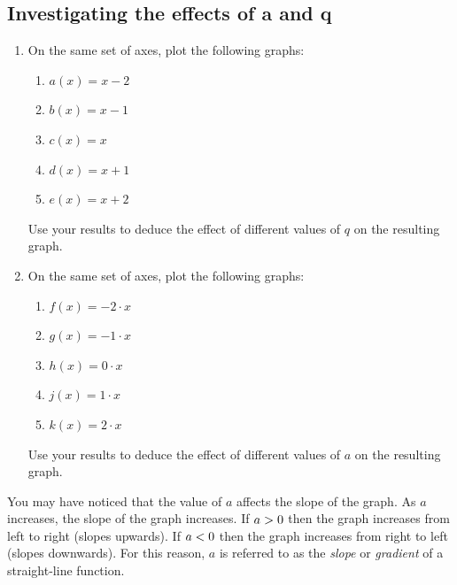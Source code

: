             \subsection{  Investigating the effects of a and q}
            \nopagebreak
        \label{m39338*id237639}\begin{enumerate}[noitemsep, label=\textbf{\arabic*}. ] 
            \label{m39338*uid70}\item On the same set of axes, plot the following graphs:
\label{m39338*id237654}\begin{enumerate}[noitemsep, label=\textbf{\alph*}. ] 
            \label{m39338*uid71}\item $a\left(x\right)=x-2$\label{m39338*uid72}\item $b\left(x\right)=x-1$\label{m39338*uid73}\item $c\left(x\right)=x$\label{m39338*uid74}\item $d\left(x\right)=x+1$\label{m39338*uid75}\item $e\left(x\right)=x+2$\end{enumerate}
Use your results to deduce the effect of different values of $q$ on the resulting graph.
\label{m39338*uid76}\item On the same set of axes, plot the following graphs:
\label{m39338*id237854}\begin{enumerate}[noitemsep, label=\textbf{\alph*}. ] 
            \label{m39338*uid77}\item $f\left(x\right)=-2\ensuremath{\cdot}x$\label{m39338*uid78}\item $g\left(x\right)=-1\ensuremath{\cdot}x$\label{m39338*uid79}\item $h\left(x\right)=0\ensuremath{\cdot}x$\label{m39338*uid80}\item $j\left(x\right)=1\ensuremath{\cdot}x$\label{m39338*uid81}\item $k\left(x\right)=2\ensuremath{\cdot}x$\end{enumerate}
Use your results to deduce the effect of different values of $a$ on the resulting graph.
\end{enumerate}
        \label{m39338*id238062}You may have noticed that the value of $a$ affects the slope of the graph. As $a$ increases, the slope of the graph increases. If $a>{}0$ then the graph increases from left to right (slopes upwards). If $a<{}0$ then the graph increases from right to left (slopes downwards). For this reason, $a$ is referred to as the \textsl{slope} or \textsl{gradient} of a straight-line function.\par 
